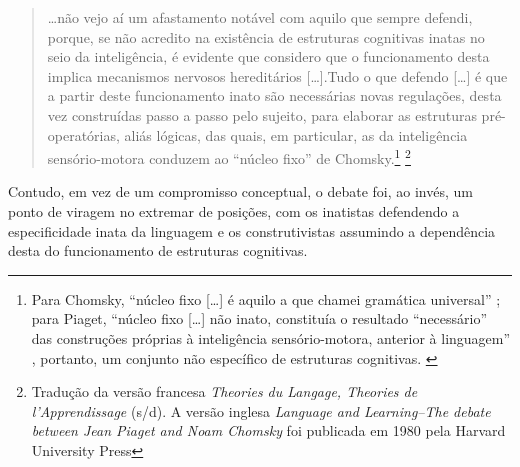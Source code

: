 \documentclass[output=paper]{LSP/langsci}
\begin{document}
\begin{quote}
\ldots não vejo aí um afastamento notável com aquilo que sempre defendi, porque, se não acredito na existência de estruturas cognitivas inatas no seio da 	inteligência, é evidente que considero que o funcionamento desta implica 	mecanismos nervosos hereditários [\ldots].Tudo o que defendo [\ldots] é que a partir deste funcionamento inato são necessárias novas regulações, desta vez construídas passo a passo pelo sujeito, para 	elaborar as estruturas pré-operatórias, aliás lógicas, das quais, em particular, as da inteligência sensório-motora conduzem ao ``núcleo fixo'' de Chomsky.\footnote{Para Chomsky, “núcleo fixo [\ldots] é aquilo a que chamei gramática universal” \citep[102]{piattelli-palmarini1987}; para Piaget, ``núcleo fixo [\ldots] não inato, constituía o resultado ``necessário'' das construções próprias à inteligência sensório-motora, anterior à linguagem'' \citep[58]{piattelli-palmarini1987}, portanto, um conjunto não específico de estruturas cognitivas. \label{ftn:simsim_rodape}} \citep[395]{piattelli-palmarini1987}\footnote{Tradução da versão francesa \textit{Theories du Langage, Theories de l’Apprendissage} (s/d). A versão inglesa \textit{Language and Learning--The debate between Jean Piaget and Noam Chomsky} foi publicada em 1980 pela Harvard University Press}
\end{quote}

Contudo, em vez de um compromisso conceptual, o debate foi, ao invés, um ponto de viragem no extremar de posições, com os inatistas defendendo a especificidade inata da linguagem e os construtivistas assumindo a dependência desta do funcionamento de estruturas cognitivas. 
\end{document}
